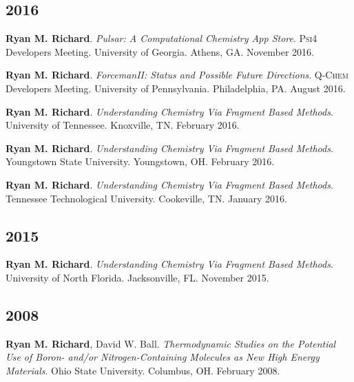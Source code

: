 \documentclass[11pt,a4paper,sans]{moderncv}
\begin{document}
\begin{etaremune}
	\subsection{2016}
	\item{\textbf{Ryan M. Richard}. \textit{Pulsar: A Computational Chemistry App Store}. \textsc{Psi4} Developers Meeting.  University of Georgia.  Athens, GA.  November 2016.}
	\item{\textbf{Ryan M. Richard}. \textit{ForcemanII: Status and Possible Future Directions}.  \textsc{Q-Chem} Developers Meeting.  University of Pennsylvania. Philadelphia, PA. August 2016.}
	\item{\textbf{Ryan M. Richard}. \textit{Understanding Chemistry Via Fragment Based Methods}. University of Tennessee.  Knoxville, TN.  February 2016.}
	\item{\textbf{Ryan M. Richard}. \textit{Understanding Chemistry Via Fragment Based Methods}. Youngstown State University.  Youngstown, OH.  February 2016.}
	\item{\textbf{Ryan M. Richard}. \textit{Understanding Chemistry Via Fragment Based Methods}. Tennessee Technological University.  Cookeville, TN.  January 2016.}
	\subsection{2015}
	\item{\textbf{Ryan M. Richard}. \textit{Understanding Chemistry Via Fragment Based Methods}. University of North Florida.  Jacksonville, FL.  November 2015.}

	\subsection{2008}
	\item{\textbf{Ryan M. Richard}, David W. Ball. \textit{Thermodynamic Studies on the Potential Use of Boron- and/or Nitrogen-Containing Molecules as New High Energy Materials}. Ohio State University. Columbus, OH. February 2008.}
\end{etaremune}
\end{document}
